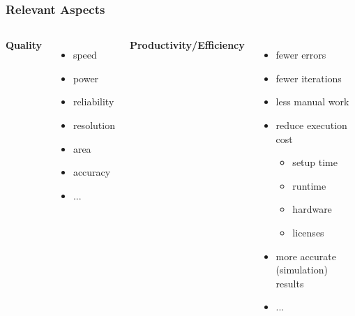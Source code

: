 \documentclass[10pt, aspectratio=169]{beamer}
\begin{document}
\begin{frame}
\frametitle{Relevant Aspects}
\begin{columns}

\textbf{Quality}
\begin{itemize}
  \item speed
  \item power
  \item reliability
  \item resolution
  \item area
  \item accuracy
  \item ...
\end{itemize}

\textbf{Productivity/Efficiency}
\begin{itemize}
  \item fewer errors
  \item fewer iterations
  \item less manual work
  \item reduce execution cost
  \begin{itemize}
    \item setup time
    \item runtime
    \item hardware
    \item licenses
  \end{itemize}
  \item more accurate (simulation) results
  \item ...
\end{itemize}
\end{columns}
\end{frame}
\end{document}
